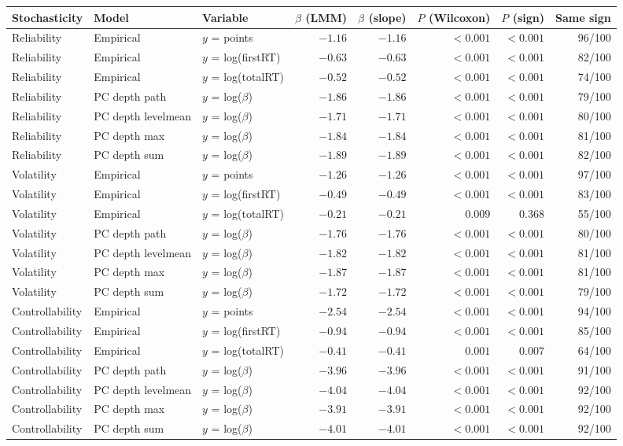 \begin{tabular}{lllrrrrr}
\toprule
Stochasticity & Model & Variable & $\beta$ (LMM) & $\beta$ (slope) & $P$ (Wilcoxon) & $P$ (sign) & Same sign \\
\midrule
Reliability & Empirical & $y$ = points & $-1.16$ & $-1.16$ & $<0.001$ & $<0.001$ & 96/100 \\
Reliability & Empirical & $y$ = log(firstRT) & $-0.63$ & $-0.63$ & $<0.001$ & $<0.001$ & 82/100 \\
Reliability & Empirical & $y$ = log(totalRT) & $-0.52$ & $-0.52$ & $<0.001$ & $<0.001$ & 74/100 \\
Reliability & PC depth path & $y$ = log($\beta$) & $-1.86$ & $-1.86$ & $<0.001$ & $<0.001$ & 79/100 \\
Reliability & PC depth levelmean & $y$ = log($\beta$) & $-1.71$ & $-1.71$ & $<0.001$ & $<0.001$ & 80/100 \\
Reliability & PC depth max & $y$ = log($\beta$) & $-1.84$ & $-1.84$ & $<0.001$ & $<0.001$ & 81/100 \\
Reliability & PC depth sum & $y$ = log($\beta$) & $-1.89$ & $-1.89$ & $<0.001$ & $<0.001$ & 82/100 \\
Volatility & Empirical & $y$ = points & $-1.26$ & $-1.26$ & $<0.001$ & $<0.001$ & 97/100 \\
Volatility & Empirical & $y$ = log(firstRT) & $-0.49$ & $-0.49$ & $<0.001$ & $<0.001$ & 83/100 \\
Volatility & Empirical & $y$ = log(totalRT) & $-0.21$ & $-0.21$ & $0.009$ & $0.368$ & 55/100 \\
Volatility & PC depth path & $y$ = log($\beta$) & $-1.76$ & $-1.76$ & $<0.001$ & $<0.001$ & 80/100 \\
Volatility & PC depth levelmean & $y$ = log($\beta$) & $-1.82$ & $-1.82$ & $<0.001$ & $<0.001$ & 81/100 \\
Volatility & PC depth max & $y$ = log($\beta$) & $-1.87$ & $-1.87$ & $<0.001$ & $<0.001$ & 81/100 \\
Volatility & PC depth sum & $y$ = log($\beta$) & $-1.72$ & $-1.72$ & $<0.001$ & $<0.001$ & 79/100 \\
Controllability & Empirical & $y$ = points & $-2.54$ & $-2.54$ & $<0.001$ & $<0.001$ & 94/100 \\
Controllability & Empirical & $y$ = log(firstRT) & $-0.94$ & $-0.94$ & $<0.001$ & $<0.001$ & 85/100 \\
Controllability & Empirical & $y$ = log(totalRT) & $-0.41$ & $-0.41$ & $0.001$ & $0.007$ & 64/100 \\
Controllability & PC depth path & $y$ = log($\beta$) & $-3.96$ & $-3.96$ & $<0.001$ & $<0.001$ & 91/100 \\
Controllability & PC depth levelmean & $y$ = log($\beta$) & $-4.04$ & $-4.04$ & $<0.001$ & $<0.001$ & 92/100 \\
Controllability & PC depth max & $y$ = log($\beta$) & $-3.91$ & $-3.91$ & $<0.001$ & $<0.001$ & 92/100 \\
Controllability & PC depth sum & $y$ = log($\beta$) & $-4.01$ & $-4.01$ & $<0.001$ & $<0.001$ & 92/100 \\
\bottomrule
\end{tabular}
